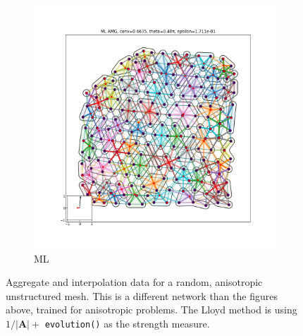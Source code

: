 \documentclass{article}
\newcommand{\abs}[1]{\left\lvert#1\right\rvert}
\newcommand{\mat}[1]{\bm{{#1}}}
\begin{document}
\begin{figure}[h]
\begin{subfigure}[t]{0.49\textwidth}
    \includegraphics[width=\textwidth, trim=80 70 70 50, clip]{anis_grid_3_ml.pdf}
    \caption{ML}
  \end{subfigure}
  \caption{Aggregate and interpolation data for a random, anisotropic unstructured mesh.  This is a different network than the figures above, trained for anisotropic problems.  The Lloyd method is using $1/\abs{\mat{A}} + $ \texttt{evolution()} as the strength measure.}
  \label{fig:anis_grid_3}
\end{figure}
\end{document}
